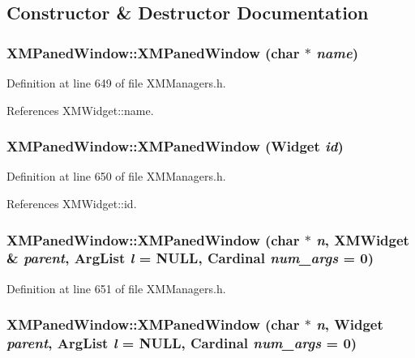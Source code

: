 \subsection{Constructor \& Destructor Documentation}
\subsubsection{\setlength{\rightskip}{0pt plus 5cm}XMPaned\-Window::XMPaned\-Window (char $\ast$ {\em name})\hspace{0.3cm}{\tt  [inline]}}\label{classXMPanedWindow_a0}




Definition at line 649 of file XMManagers.h.

References XMWidget::name.
\subsubsection{\setlength{\rightskip}{0pt plus 5cm}XMPaned\-Window::XMPaned\-Window (Widget {\em id})\hspace{0.3cm}{\tt  [inline]}}\label{classXMPanedWindow_a1}




Definition at line 650 of file XMManagers.h.

References XMWidget::id.
\subsubsection{\setlength{\rightskip}{0pt plus 5cm}XMPaned\-Window::XMPaned\-Window (char $\ast$ {\em n}, {\bf XMWidget} \& {\em parent}, Arg\-List {\em l} = NULL, Cardinal {\em num\_\-args} = 0)\hspace{0.3cm}{\tt  [inline]}}\label{classXMPanedWindow_a2}




Definition at line 651 of file XMManagers.h.
\subsubsection{\setlength{\rightskip}{0pt plus 5cm}XMPaned\-Window::XMPaned\-Window (char $\ast$ {\em n}, Widget {\em parent}, Arg\-List {\em l} = NULL, Cardinal {\em num\_\-args} = 0)\hspace{0.3cm}{\tt  [inline]}}\label{classXMPanedWindow_a3}




